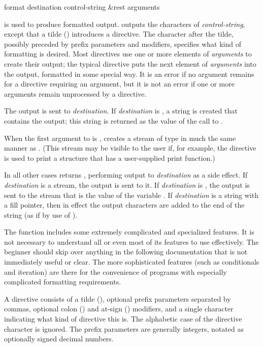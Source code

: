 \begin{defun}[Function]
format destination control-string &rest arguments

 is used to produce formatted output.
 outputs the characters of \emph{control-string},
except that a tilde (\cd{{\Xtilde}}) introduces a directive.
The character after
the tilde, possibly preceded by prefix parameters and modifiers, specifies
what kind of formatting is desired.  Most directives use one or more
elements of \emph{arguments} to create their output; the typical directive
puts the next element of \emph{arguments} into the output, formatted in
some special way.  It is an error if no argument remains for a directive
requiring an argument, but it is not an error if one or more arguments
remain unprocessed by a directive.

The output is sent to \emph{destination}.  If \emph{destination} is
{\false}, a string is created that contains the output; this string is
returned as the value of the call to .

When the first argument
to  is ,  creates a stream
of type  in much the same manner as .
(This stream may be visible to the user if, for example, the 
directive is used to print a  structure that has a user-supplied
print function.)

In all other cases
 returns {\false}, performing output to \emph{destination}
as a side effect.
If \emph{destination} is a stream, the output is sent to it.  If
\emph{destination} is {\true}, the output is sent to the stream
that is the value of the variable .
If \emph{destination} is a string with a fill pointer, then
in effect the output characters are added to the end of the string
(as if by use of ).

The  function includes some extremely complicated and specialized
features.  It is not necessary to understand all or even most of its
features to use  effectively.  The beginner should
skip over anything in the following documentation that is not
immediately useful or clear.  The more sophisticated features
(such as conditionals and iteration) are
there for the convenience of programs with especially complicated formatting
requirements.

A  directive consists of a tilde (\cd{{\Xtilde}}),
optional prefix parameters
separated by commas, optional colon (\cd{:}) and at-sign (\cd{{\Xatsign}}) modifiers,
and a single character indicating what kind of directive this is.
The alphabetic case of the directive character is ignored.
The prefix parameters are generally integers,
notated as optionally signed decimal numbers.


\end{defun}
